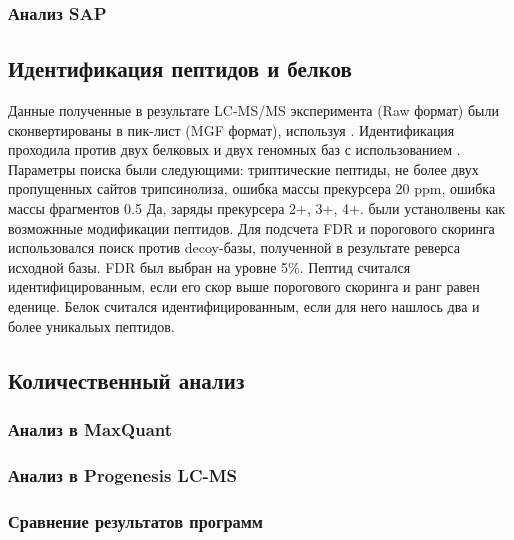 \subsubsection{Анализ SAP}

\subsection{Идентификация пептидов и белков}
Данные полученные в результате LC-MS/MS эксперимента (Raw формат) были сконвертированы в пик-лист (MGF формат), используя  \cite{chambers2012cross}. Идентификация проходила против двух белковых и двух геномных баз с использованием  \cite{cottrell1999probability}. Параметры поиска были следующими: триптические пептиды, не более двух пропущенных сайтов трипсинолиза, ошибка массы прекурсера 20 ppm, ошибка массы фрагментов 0.5 Да, заряды прекурсера 2+, 3+, 4+.  были устанолвены как возможнные модификации пептидов. Для подсчета FDR и порогового скоринга использовался поиск против decoy-базы, полученной в результате реверса исходной базы. FDR был выбран на уровне 5\%.
Пептид считался идентифицированным, если его скор выше порогового скоринга и ранг равен еденице. Белок считался идентифицированным, если для него нашлось два и более уникальых пептидов.

\subsection{Количественный анализ}
\subsubsection{Анализ в MaxQuant}
\subsubsection{Анализ в Progenesis LC-MS}
\subsubsection{Сравнение результатов программ}



\newpage
